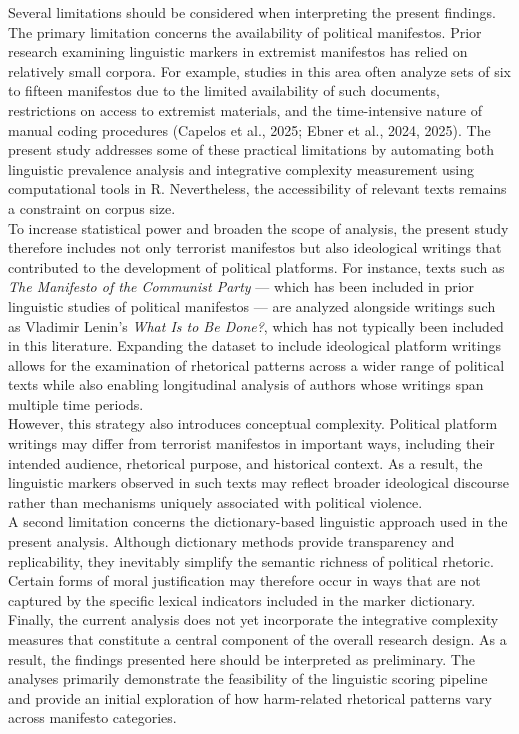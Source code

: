 \documentclass[
  english,
  man,floatsintext]{apa6}
\begin{document}
Several limitations should be considered when interpreting the present findings. The primary limitation concerns the availability of political manifestos. Prior research examining linguistic markers in extremist manifestos has relied on relatively small corpora. For example, studies in this area often analyze sets of six to fifteen manifestos due to the limited availability of such documents, restrictions on access to extremist materials, and the time-intensive nature of manual coding procedures (Capelos et al., 2025; Ebner et al., 2024, 2025). The present study addresses some of these practical limitations by automating both linguistic prevalence analysis and integrative complexity measurement using computational tools in R. Nevertheless, the accessibility of relevant texts remains a constraint on corpus size.\\
To increase statistical power and broaden the scope of analysis, the present study therefore includes not only terrorist manifestos but also ideological writings that contributed to the development of political platforms. For instance, texts such as \emph{The Manifesto of the Communist Party} --- which has been included in prior linguistic studies of political manifestos --- are analyzed alongside writings such as Vladimir Lenin's \emph{What Is to Be Done?}, which has not typically been included in this literature. Expanding the dataset to include ideological platform writings allows for the examination of rhetorical patterns across a wider range of political texts while also enabling longitudinal analysis of authors whose writings span multiple time periods.\\
However, this strategy also introduces conceptual complexity. Political platform writings may differ from terrorist manifestos in important ways, including their intended audience, rhetorical purpose, and historical context. As a result, the linguistic markers observed in such texts may reflect broader ideological discourse rather than mechanisms uniquely associated with political violence.\\
A second limitation concerns the dictionary-based linguistic approach used in the present analysis. Although dictionary methods provide transparency and replicability, they inevitably simplify the semantic richness of political rhetoric. Certain forms of moral justification may therefore occur in ways that are not captured by the specific lexical indicators included in the marker dictionary.\\
Finally, the current analysis does not yet incorporate the integrative complexity measures that constitute a central component of the overall research design. As a result, the findings presented here should be interpreted as preliminary. The analyses primarily demonstrate the feasibility of the linguistic scoring pipeline and provide an initial exploration of how harm-related rhetorical patterns vary across manifesto categories.
\end{document}
